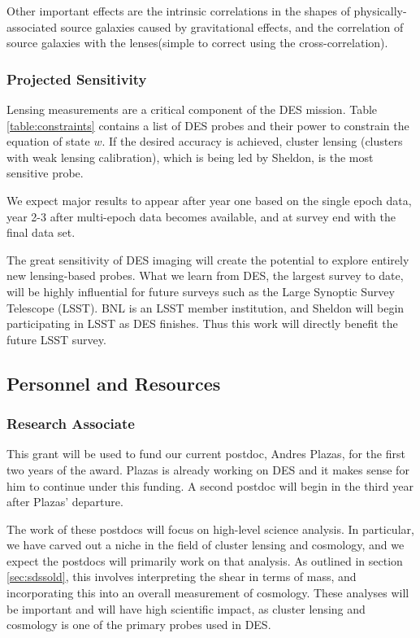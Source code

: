 \documentclass[12pt]{article}
\begin{document}
Other important effects are the intrinsic correlations in the shapes of
physically-associated source galaxies caused by gravitational
effects\cite{HirataIntrinsicAlign07}, and the correlation of source galaxies
with the lenses\cite{SheldonLensing07}(simple to correct using the
cross-correlation).

\subsubsection{Projected Sensitivity}

Lensing measurements are a critical component of the DES mission.  Table
\ref{table:constraints} contains a list of DES probes and their power to
constrain the equation of state $w$.  If the desired accuracy is achieved,
cluster lensing (clusters with weak lensing calibration), which is being led by
Sheldon, is the most sensitive probe.

We expect major results to appear after year one based on the single epoch
data, year 2-3 after multi-epoch data becomes available, and at survey end with
the final data set.

The great sensitivity of DES imaging will create the potential to explore
entirely new lensing-based probes.  What we learn from DES, the largest survey
to date, will be highly influential for future surveys such as the Large
Synoptic Survey Telescope (LSST). BNL is an LSST member institution, and
Sheldon will begin participating in LSST as DES finishes.  Thus this work will
directly benefit the future LSST survey.

\subsection{Personnel and Resources} \label{sec:resources}

\subsubsection{Research Associate}

This grant will be used to fund our current postdoc, Andres Plazas, for the
first two years of the award. Plazas is already working on DES and it makes
sense for him to continue under this funding.  A second postdoc will begin in
the third year after Plazas' departure.  

The work of these postdocs will focus on high-level science analysis.  In
particular, we have carved out a niche in the field of cluster lensing and
cosmology, and we expect the postdocs will primarily work on that analysis.  As
outlined in section \ref{sec:sdssold}, this involves interpreting the shear in
terms of mass, and incorporating this into an overall measurement of cosmology.
These analyses will be important and will have high scientific impact, as
cluster lensing and cosmology is one of the primary probes used in DES.
\end{document}
